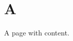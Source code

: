 \chapter{A }
\hypertarget{md__2comm_2docs_2md_2a}{}\label{md__2comm_2docs_2md_2a}
\label{md__2comm_2docs_2md_2a_autotoc_md0}%
%


A page with content. 